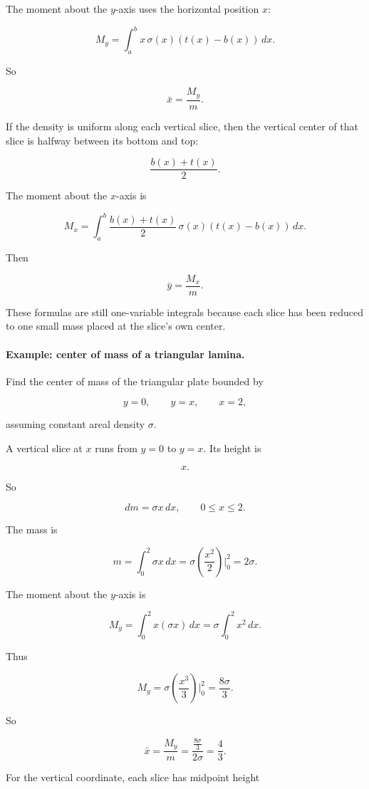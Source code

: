 The moment about the \(y\)-axis uses the horizontal position \(x\):

\[
\boxed{
M_y=\int_a^b x\,\sigma(x)(t(x)-b(x))\,dx.
}
\]

So

\[
\boxed{
\bar x=\frac{M_y}{m}.
}
\]

If the density is uniform along each vertical slice, then the vertical center of that
slice is halfway between its bottom and top:

\[
\frac{b(x)+t(x)}{2}.
\]

The moment about the \(x\)-axis is

\[
\boxed{
M_x=\int_a^b
\frac{b(x)+t(x)}{2}\,
\sigma(x)(t(x)-b(x))\,dx.
}
\]

Then

\[
\boxed{
\bar y=\frac{M_x}{m}.
}
\]

These formulas are still one-variable integrals because each slice has been reduced
to one small mass placed at the slice's own center.

\paragraph{Example: center of mass of a triangular lamina.}
Find the center of mass of the triangular plate bounded by

\[
y=0,\qquad y=x,\qquad x=2,
\]

assuming constant areal density \(\sigma\).

A vertical slice at \(x\) runs from \(y=0\) to \(y=x\).  Its height is

\[
x.
\]

So

\[
dm=\sigma x\,dx,
\qquad 0\le x\le2.
\]

The mass is

\[
m=\int_0^2 \sigma x\,dx
=
\sigma\left(\frac{x^2}{2}\right)\Big|_0^2
=
2\sigma.
\]

The moment about the \(y\)-axis is

\[
M_y=\int_0^2 x(\sigma x)\,dx
=
\sigma\int_0^2 x^2\,dx.
\]

Thus

\[
M_y
=
\sigma\left(\frac{x^3}{3}\right)\Big|_0^2
=
\frac{8\sigma}{3}.
\]

So

\[
\bar x=\frac{M_y}{m}
=
\frac{\frac{8\sigma}{3}}{2\sigma}
=
\boxed{\frac43}.
\]

For the vertical coordinate, each slice has midpoint height

